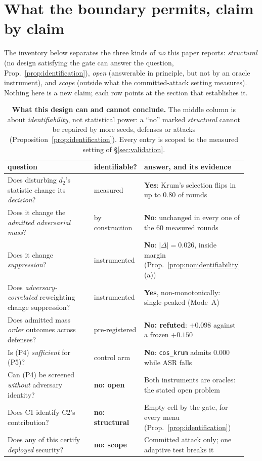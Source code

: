 \documentclass{article}
\begin{document}
\section{What the boundary permits, claim by claim}
\label{app:can_cannot}

The inventory below separates the three kinds of \emph{no} this paper reports: \emph{structural} (no design satisfying the gate can answer the question, Prop.~\ref{prop:identification}), \emph{open} (answerable in principle, but not by an oracle instrument), and \emph{scope} (outside what the committed-attack setting measures). Nothing here is a new claim; each row points at the section that establishes it.

\begin{table}[h]
\caption{\textbf{What this design can and cannot conclude.} The middle column is about
\emph{identifiability}, not statistical power: a ``no'' marked \emph{structural} cannot be repaired by
more seeds, defenses or attacks (Proposition~\ref{prop:identification}). Every entry is scoped to the
measured setting of \S\ref{sec:validation}.}
\label{tab:can_cannot}
\centering\scriptsize\setlength{\tabcolsep}{4pt}
\begin{tabular}{@{}p{0.42\linewidth}p{0.14\linewidth}p{0.38\linewidth}@{}}
\toprule
\textbf{question} & \textbf{identifiable?} & \textbf{answer, and its evidence} \\
\midrule
Does disturbing $d_2$'s statistic change its \emph{decision}? & measured & \textbf{Yes}: Krum's selection flips in up to $0.80$ of rounds \\
Does it change the \emph{admitted adversarial mass}? & by construction & \textbf{No}: unchanged in every one of the $60$ measured rounds \\
Does it change \emph{suppression}? & instrumented & \textbf{No}: $|\Delta|{=}0.026$, inside margin (Prop.~\ref{prop:nonidentifiability}(a)) \\
Does \emph{adversary-correlated} reweighting change suppression? & instrumented & \textbf{Yes}, non-monotonically: single-peaked (Mode~A) \\
Does admitted mass \emph{order} outcomes across defenses? & pre-registered & \textbf{No: refuted}: $+0.098$ against a frozen ${+}0.150$ \\
Is (P4) \emph{sufficient} for (P5)? & control arm & \textbf{No}: \texttt{cos\_krum} admits $0.000$ while ASR falls \\
Can (P4) be screened \emph{without} adversary identity? & \textbf{no: open} & Both instruments are oracles: the stated open problem \\
Does C1 identify C2's contribution? & \textbf{no: structural} & Empty cell by the gate, for every menu (Prop.~\ref{prop:identification}) \\
Does any of this certify \emph{deployed} security? & \textbf{no: scope} & Committed attack only; one adaptive test breaks it \\
\bottomrule
\end{tabular}
\end{table}
\end{document}
